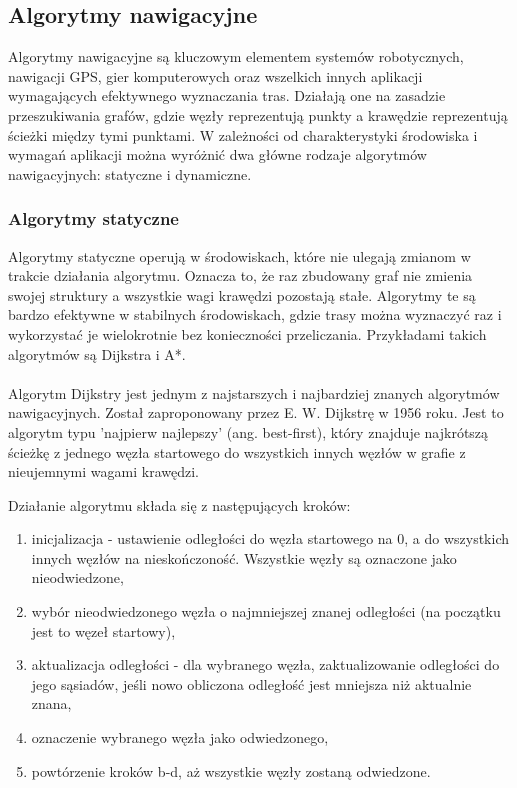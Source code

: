 \documentclass[12pt,twoside]{article}
\begin{document}
\subsection{Algorytmy nawigacyjne}

Algorytmy nawigacyjne są kluczowym elementem systemów robotycznych, nawigacji GPS, gier komputerowych oraz wszelkich innych aplikacji wymagających efektywnego wyznaczania tras. Działają one na zasadzie przeszukiwania grafów, gdzie węzły reprezentują punkty a krawędzie reprezentują ścieżki między tymi punktami. W zależności od charakterystyki środowiska i wymagań aplikacji można wyróżnić dwa główne rodzaje algorytmów nawigacyjnych: statyczne i dynamiczne.

\subsubsection{Algorytmy statyczne}

Algorytmy statyczne operują w środowiskach, które nie ulegają zmianom w trakcie działania algorytmu. Oznacza to, że raz zbudowany graf nie zmienia swojej struktury a wszystkie wagi krawędzi pozostają stałe. Algorytmy te są bardzo efektywne w stabilnych środowiskach, gdzie trasy można wyznaczyć raz i wykorzystać je wielokrotnie bez konieczności przeliczania. Przykładami takich algorytmów są Dijkstra i A*.
\\ \\
Algorytm Dijkstry \cite{DIJKSTRA} jest jednym z najstarszych i najbardziej znanych algorytmów nawigacyjnych. Został zaproponowany przez E. W. Dijkstrę w 1956 roku. Jest to algorytm typu 'najpierw najlepszy' (ang. best-first), który znajduje najkrótszą ścieżkę z jednego węzła startowego do wszystkich innych węzłów w grafie z nieujemnymi wagami krawędzi.
\newpage

Działanie algorytmu składa się z następujących kroków:

\begin{enumerate}[label=\alph*), leftmargin=1.25cm]
	\item inicjalizacja - ustawienie odległości do węzła startowego na 0, a do wszystkich innych węzłów na nieskończoność. Wszystkie węzły są oznaczone jako nieodwiedzone,
	\item wybór nieodwiedzonego węzła o najmniejszej znanej odległości (na początku jest to węzeł startowy),
	\item aktualizacja odległości - dla wybranego węzła, zaktualizowanie odległości do jego sąsiadów, jeśli nowo obliczona odległość jest mniejsza niż aktualnie znana,
	\item oznaczenie wybranego węzła jako odwiedzonego,
	\item powtórzenie kroków b-d, aż wszystkie węzły zostaną odwiedzone.
	
\end{enumerate}
\end{document}
